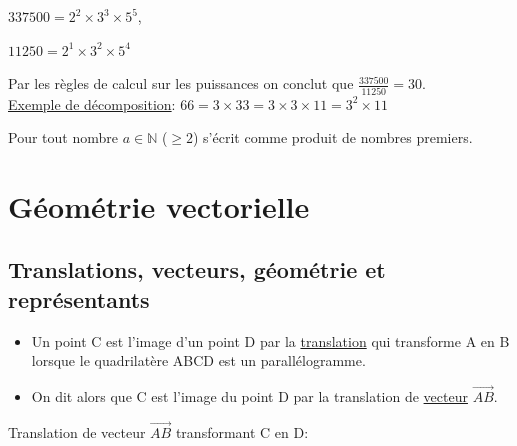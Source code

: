 \documentclass[french]{book}
\begin{document}
$337 500=2^2 \times 3^3 \times 5^5$, 


$11 250=2^1 \times 3^2 \times 5^4$

Par les règles de calcul sur les puissances on conclut que $\frac{337 500}{11 250}=30$. \\


\underline{Exemple de décomposition}: $66=3 \times 33 = 3 \times 3 \times 11 = 3^2 \times 11$ 

\begin{thm}
Pour tout nombre $a \in \mathbb{N}$ ($\geq 2$) s'écrit comme produit de nombres premiers.
\end{thm}

\chapter{Géométrie vectorielle}

\section{Translations, vecteurs, géométrie et représentants} 

\begin{defn}
\begin{itemize}
\item Un point C est l’image d’un point D par la \underline{translation} qui transforme A en B lorsque le quadrilatère ABCD est un parallélogramme.
\item On dit alors que C est l’image du point D par la translation de \underline{vecteur} $\overrightarrow{AB}$.
\end{itemize}
\end{defn}

Translation de vecteur $\overrightarrow{AB}$ transformant C en D: 
\end{document}
